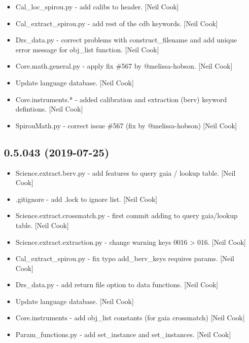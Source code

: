 \documentclass[a4paper,10pt,english]{report}
\begin{document}
\begin{itemize}
\item {} 
Cal\_loc\_spirou.py - add calibs to header. {[}Neil Cook{]}

\item {} 
Cal\_extract\_spirou.py - add rest of the cdb keywords. {[}Neil Cook{]}

\item {} 
Drs\_data.py - correct problems with construct\_filename and add unique
error message for obj\_list function. {[}Neil Cook{]}

\item {} 
Core.math.general.py - apply fix \#567 by @melissa-hobson. {[}Neil Cook{]}

\item {} 
Update language database. {[}Neil Cook{]}

\item {} 
Core.instruments.* - added calibration and extraction (berv) keyword
defintions. {[}Neil Cook{]}

\item {} 
SpirouMath.py - correct issue \#567 (fix by @melissa-hobson) {[}Neil
Cook{]}

\end{itemize}


\subsection{0.5.043 (2019-07-25)}
\label{\detokenize{misc/changelog:id97}}\begin{itemize}
\item {} 
Science.extract.berv.py - add features to query gaia / lookup table.
{[}Neil Cook{]}

\item {} 
.gitignore - add .lock to ignore list. {[}Neil Cook{]}

\item {} 
Science.extract.crossmatch.py - first commit \textendash{} adding to query
gaia/lookup table. {[}Neil Cook{]}

\item {} 
Science.extract.extraction.py - change warning keys 0016 \textendash{}\textgreater{} 016.
{[}Neil Cook{]}

\item {} 
Cal\_extract\_spirou.py - fix typo add\_berv\_keys requires params. {[}Neil
Cook{]}

\item {} 
Drs\_data.py - add return file option to data functions. {[}Neil Cook{]}

\item {} 
Update language database. {[}Neil Cook{]}

\item {} 
Core.instruments - add obj\_list constants (for gaia crossmatch) {[}Neil
Cook{]}

\item {} 
Param\_functions.py - add set\_instance and set\_instances. {[}Neil Cook{]}

\end{itemize}
\end{document}
